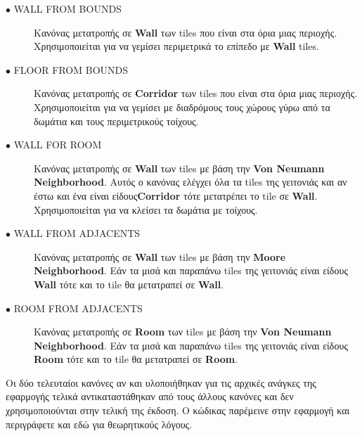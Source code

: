 \begin{description}
\item[$\bullet$ WALL FROM BOUNDS] Κανόνας μετατροπής σε \textbf{Wall} των tiles που είναι στα όρια μιας περιοχής. Χρησιμοποιείται για να γεμίσει περιμετρικά το επίπεδο με \textbf{Wall} tiles.
\item[$\bullet$ FLOOR FROM BOUNDS] Κανόνας μετατροπής σε \textbf{Corridor} των tiles που είναι στα όρια μιας περιοχής. Χρησιμοποιείται για να γεμίσει με διαδρόμους τους χώρους γύρω από τα δωμάτια και τους περιμετρικούς τοίχους.
\item[$\bullet$ WALL FOR ROOM] Κανόνας μετατροπής σε \textbf{Wall} των tiles με βάση την \textbf{Von Neumann Neighborhood}. Αυτός ο κανόνας ελέγχει όλα τα tiles της γειτονιάς και αν έστω και ένα είναι είδους\textbf{Corridor} τότε μετατρέπει το tile σε \textbf{Wall}. Χρησιμοποιείται για να κλείσει τα δωμάτια με τοίχους.
\item[$\bullet$ WALL FROM ADJACENTS] Κανόνας μετατροπής σε \textbf{Wall} των tiles με βάση την \textbf{Moore Neighborhood}. Εάν τα μισά και παραπάνω tiles της γειτονιάς είναι είδους \textbf{Wall} τότε και το tile θα μετατραπεί σε \textbf{Wall}.
\item[$\bullet$ ROOM FROM ADJACENTS] Κανόνας μετατροπής σε \textbf{Room} των tiles με βάση την \textbf{Von Neumann Neighborhood}. Εάν τα μισά και παραπάνω tiles της γειτονιάς είναι είδους \textbf{Room} τότε και το tile θα μετατραπεί σε \textbf{Room}.
\end{description}

\par
Οι δύο τελευταίοι κανόνες αν και υλοποιήθηκαν για τις αρχικές ανάγκες της εφαρμογής τελικά αντικαταστάθηκαν από τους άλλους κανόνες και δεν χρησιμοποιούνται στην τελική της έκδοση. O κώδικας παρέμεινε στην εφαρμογή και περιγράφετε και εδώ για θεωρητικούς λόγους.


